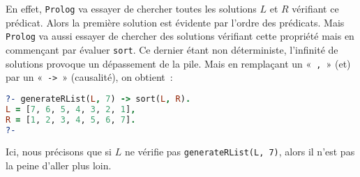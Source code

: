 En effet, \texttt{Prolog} va essayer de chercher toutes les solutions $L$ et $R$ vérifiant ce
prédicat. Alors la première solution est évidente par l'ordre des prédicats. Mais
\texttt{Prolog} va aussi essayer de chercher des solutions vérifiant cette propriété mais en commençant par évaluer
\texttt{sort}. Ce dernier étant non déterministe, l'infinité de solutions provoque un dépassement de la pile.
Mais en remplaçant un «~\texttt{,}~» (et) par un «~\texttt{->}~» (causalité), on obtient~:
\begin{lstlisting}[language=Prolog,frame=single]
?- generateRList(L, 7) -> sort(L, R).
L = [7, 6, 5, 4, 3, 2, 1],
R = [1, 2, 3, 4, 5, 6, 7].
?-
\end{lstlisting}

Ici, nous précisons que si $L$ ne vérifie pas \texttt{generateRList(L, 7)}, alors
il n'est pas la peine d'aller plus loin.
